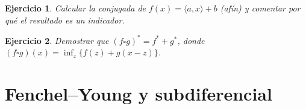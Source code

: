 \documentclass[11pt]{report}
\newtheorem{ex}{Ejercicio}
\newcommand{\R}{\mathbb{R}}
\newcommand{\indic}{I}
\newcommand{\supp}{\sigma}
\begin{document}
\begin{ex}
Calcular la conjugada de $f(x)=\langle a,x\rangle+b$ (afín) y
comentar por qué el resultado es un indicador.
\end{ex}


\begin{ex}
Demostrar que $(f\square g)^*=f^*+g^*$, donde
$(f\square g)(x)=\inf_z\{f(z)+g(x-z)\}$.
\end{ex}

\section{Fenchel--Young y subdiferencial}
\end{document}
